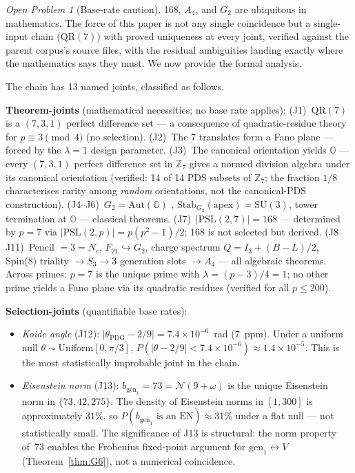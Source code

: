 \documentclass[11pt]{article}
\theoremstyle{remark}
\newtheorem{openprob}{Open Problem}
\begin{document}
\begin{openprob}[Base-rate caution]
168, $A_4$, and $G_2$ are ubiquitous in mathematics.
The force of this paper is not any single coincidence but a single-input chain
($\mathrm{QR}(7)$) with proved uniqueness at every joint, verified against the
parent corpus's source files, with the residual ambiguities landing exactly where
the mathematics says they must.
We now provide the formal analysis.

The chain has 13 named joints, classified as follows.

\smallskip
\noindent\textbf{Theorem-joints} (mathematical necessities; no base rate applies):
(J1)~$\mathrm{QR}(7)$ is a $(7,3,1)$ perfect difference set --- a consequence of
quadratic-residue theory for $p\equiv 3\pmod{4}$ (no selection).
(J2)~The 7 translates form a Fano plane --- forced by the $\lambda=1$ design parameter.
(J3)~The canonical orientation yields $\mathbb{O}$ --- every $(7,3,1)$ perfect difference
set in $\mathbb{Z}_7$ gives a normed division algebra under its canonical orientation
(verified: 14 of 14 PDS subsets of $\mathbb{Z}_7$; the fraction $1/8$ characterises
rarity among \emph{random} orientations, not the canonical-PDS construction).
(J4--J6)~$G_2=\mathrm{Aut}(\mathbb{O})$ \cite{Cartan1925},
$\mathrm{Stab}_{G_2}(\mathrm{apex})=\mathrm{SU}(3)$,
tower termination at $\mathbb{O}$ \cite{Hurwitz1898} --- classical theorems.
(J7)~$|\mathrm{PSL}(2,7)|=168$ --- determined by $p=7$ via $|\mathrm{PSL}(2,p)|=p(p^2-1)/2$;
168 is not selected but derived.
(J8--J11)~Pencil $=3=N_c$, $F_{21}\hookrightarrow G_2$,
charge spectrum $Q=I_3+(B{-}L)/2$,
Spin(8) triality $\to S_3\to 3$ generation slots $\to A_4$ --- all algebraic theorems.
Across primes: $p=7$ is the unique prime with $\lambda=(p-3)/4=1$; no other prime
yields a Fano plane via its quadratic residues (verified for all $p\leq 200$).

\smallskip
\noindent\textbf{Selection-joints} (quantifiable base rates):
\begin{itemize}[noitemsep,topsep=2pt]
\item \emph{Koide angle} (J12): $|\theta_{\mathrm{PDG}} - 2/9| = 7.4\times10^{-6}$~rad
  (7~ppm).
  Under a uniform null $\theta\sim\mathrm{Uniform}[0,\pi/3]$,
  $P(|\theta-2/9|<7.4\times 10^{-6}) \approx 1.4\times 10^{-5}$.
  This is the most statistically improbable joint in the chain.
\item \emph{Eisenstein norm} (J13): $b_{\mathrm{gen}_1}=73=\mathcal{N}(9+\omega)$ is the
  unique Eisenstein norm in $\{73,42,275\}$.
  The density of Eisenstein norms in $[1,300]$ is approximately $31\%$, so
  $P(b_{\mathrm{gen}_1}\text{ is an EN})\approx 31\%$ under a flat null --- not
  statistically small.
  The significance of J13 is structural: the norm property of~73 enables the
  Frobenius fixed-point argument for $\mathrm{gen}_1\leftrightarrow V$
  (Theorem~\ref{thm:G6}), not a numerical coincidence.
\end{itemize}


\end{openprob}
\end{document}
